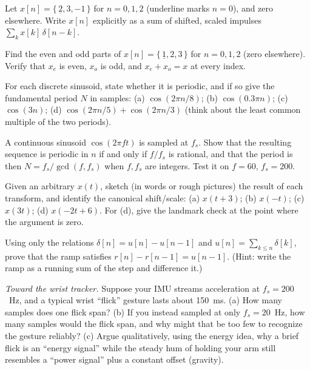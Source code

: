 \begin{exercise}
Let $x[n] = \{\,\underline{2}, 3, -1\,\}$ for $n = 0,1,2$ (underline marks $n=0$),
and zero elsewhere. Write $x[n]$ explicitly as a sum of shifted, scaled impulses
$\sum_k x[k]\,\delta[n-k]$.
\end{exercise}

\begin{exercise}
Find the even and odd parts of $x[n] = \{\,\underline{1}, 2, 3\,\}$ for $n=0,1,2$
(zero elsewhere). Verify that $x_e$ is even, $x_o$ is odd, and $x_e + x_o = x$ at
every index.
\end{exercise}

\begin{exercise}
For each discrete sinusoid, state whether it is periodic, and if so give the
fundamental period $N$ in samples: (a) $\cos(2\pi n/8)$; \;(b) $\cos(0.3\pi n)$;
\;(c) $\cos(3 n)$; \;(d) $\cos(2\pi n / 5) + \cos(2\pi n / 3)$ (think about the
least common multiple of the two periods).
\end{exercise}

\begin{exercise}
A continuous sinusoid $\cos(2\pi f t)$ is sampled at $f_s$. Show that the resulting
sequence is periodic in $n$ if and only if $f/f_s$ is rational, and that the period
is then $N = f_s / \gcd(f, f_s)$ when $f, f_s$ are integers. Test it on $f = 60$,
$f_s = 200$.
\end{exercise}

\begin{exercise}
Given an arbitrary $x(t)$, sketch (in words or rough pictures) the result of each
transform, and identify the canonical shift/scale: (a) $x(t+3)$; \;(b) $x(-t)$;
\;(c) $x(3t)$; \;(d) $x(-2t + 6)$. For (d), give the landmark check at the point
where the argument is zero.
\end{exercise}

\begin{exercise}
Using only the relations $\delta[n] = u[n] - u[n-1]$ and $u[n] = \sum_{k\le n}
\delta[k]$, prove that the ramp satisfies $r[n] - r[n-1] = u[n-1]$. (Hint: write the
ramp as a running sum of the step and difference it.)
\end{exercise}

\begin{exercise}
\emph{Toward the wrist tracker.} Suppose your IMU streams acceleration at
$f_s = 200$~Hz, and a typical wrist ``flick'' gesture lasts about 150~ms. (a) How
many samples does one flick span? (b) If you instead sampled at only $f_s = 20$~Hz,
how many samples would the flick span, and why might that be too few to recognize
the gesture reliably? (c) Argue qualitatively, using the energy idea, why a brief
flick is an ``energy signal'' while the steady hum of holding your arm still
resembles a ``power signal'' plus a constant offset (gravity).
\end{exercise}

